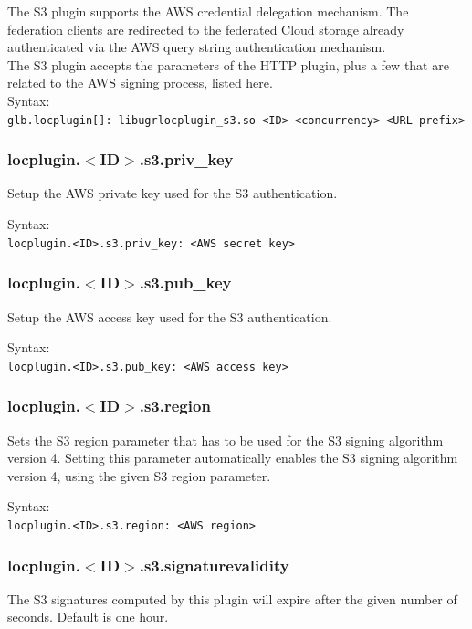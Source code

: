 \documentclass[12pt]{article} %
\begin{document}
The S3 plugin supports the AWS credential delegation mechanism. The federation clients are redirected to the federated Cloud storage already authenticated via the AWS query string authentication mechanism.\\
The S3 plugin accepts the parameters of the HTTP plugin, plus a few that are related to the AWS signing process, listed here.\\

Syntax:\\
\lstinline"glb.locplugin[]: libugrlocplugin_s3.so <ID> <concurrency> <URL prefix>"\\

\subsubsection{locplugin.$<$ID$>$.s3.priv\_key}
Setup the AWS private key used for the S3 authentication.

Syntax:\\
\lstinline"locplugin.<ID>.s3.priv_key: <AWS secret key>"\\


\subsubsection{locplugin.$<$ID$>$.s3.pub\_key}
Setup the AWS access key used for the S3 authentication.

Syntax:\\
\lstinline"locplugin.<ID>.s3.pub_key: <AWS access key>"\\

\subsubsection{locplugin.$<$ID$>$.s3.region}
Sets the S3 region parameter that has to be used for the S3 signing algorithm version 4. Setting this parameter automatically
enables the S3 signing algorithm version 4, using the given S3 region parameter.

Syntax:\\
\lstinline"locplugin.<ID>.s3.region: <AWS region>"\\


\subsubsection{locplugin.$<$ID$>$.s3.signaturevalidity}
The S3 signatures computed by this plugin will expire after the given number of seconds. Default is one hour.\\
\end{document}

